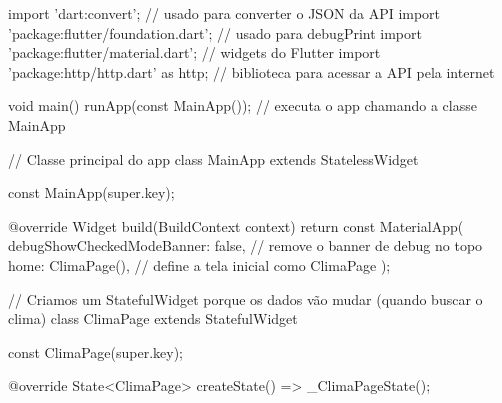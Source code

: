 import 'dart:convert'; // usado para converter o JSON da API
import 'package:flutter/foundation.dart'; // usado para debugPrint
import 'package:flutter/material.dart'; // widgets do Flutter
import 'package:http/http.dart' as http; // biblioteca para acessar a API pela internet

void main() {
  runApp(const MainApp()); // executa o app chamando a classe MainApp
}

// Classe principal do app
class MainApp extends StatelessWidget {
  const MainApp({super.key});

  @override
  Widget build(BuildContext context) {
    return const MaterialApp(
      debugShowCheckedModeBanner: false, // remove o banner de debug no topo
      home: ClimaPage(), // define a tela inicial como ClimaPage
    );
  }
}

// Criamos um StatefulWidget porque os dados vão mudar (quando buscar o clima)
class ClimaPage extends StatefulWidget {
  const ClimaPage({super.key});

  @override
  State<ClimaPage> createState() => _ClimaPageState();
}

